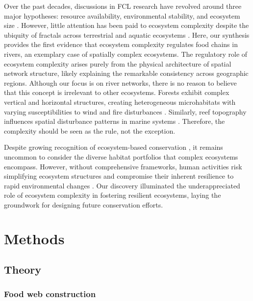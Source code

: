 \documentclass[11pt, class=article, crop=false]{standalone}
\begin{document}
Over the past decades, discussions in FCL research have revolved around three major hypotheses: resource availability, environmental stability, and ecosystem size \citep{oksanen_exploitation_1981, pimm_number_1977, schoener_food_1989}.
However, little attention has been paid to ecosystem complexity despite the ubiquity of fractals across terrestrial \citep{turner_landscape_2015} and aquatic ecosystems \citep{rodriguez-iturbe_fractal_2001}.
Here, our synthesis provides the first evidence that ecosystem complexity regulates food chains in rivers, an exemplary case of spatially complex ecosystems.
The regulatory role of ecosystem complexity arises purely from the physical architecture of spatial network structure, likely explaining the remarkable consistency across geographic regions.
Although our focus is on river networks, there is no reason to believe that this concept is irrelevant to other ecosystems.
Forests exhibit complex vertical and horizontal structures, creating heterogeneous microhabitats with varying susceptibilities to wind and fire disturbances \citep{peterson_contagious_2002, cansler_climate_2014}.
Similarly, reef topography influences spatial disturbance patterns in marine systems \citep{connell_30year_1997}.
Therefore, the complexity should be seen as the rule, not the exception.

Despite growing recognition of ecosystem-based conservation \citep{schindler_portfolio_2015}, it remains uncommon to consider the diverse habitat portfolios that complex ecosystems encompass.
However, without comprehensive frameworks, human activities risk simplifying ecosystem structures \citep{turner_landscape_2015, grill_mapping_2019} and compromise their inherent resilience to rapid environmental changes \citep{turner_landscape_2015}.
Our discovery illuminated the underappreciated role of ecosystem complexity in fostering resilient ecosystems, laying the groundwork for designing future conservation efforts.

\newpage

\section{Methods}

\subsection{Theory}

\subsubsection{Food web construction}
\end{document}
